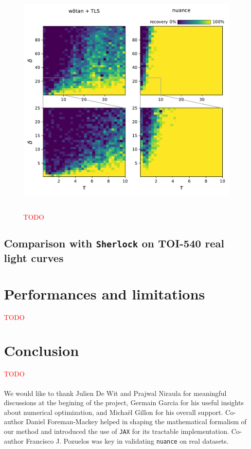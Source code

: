\documentclass{aastex631}
\newcommand{\TODO}{\textcolor{red}{TODO}}
\begin{document}
\begin{figure}[H]
    \begin{centering}
        \includegraphics[height=12cm]{../workflows/synthetic_injection_recovery/figures/final_result.pdf}
        \caption{\TODO}
        \label{fig:simu}
    \end{centering}
\end{figure}

\subsection{Comparison with \texttt{Sherlock} on TOI-540 real light curves}\label{real}

\section{Performances and limitations}\label{perf}
\TODO

\section{Conclusion}
\TODO
\\\\
We would like to thank Julien De Wit and Prajwal Niraula for meaningful discussions at the begining of the project, Germain Garcia for his useful insights about numerical optimization, and Michaël Gillon for his overall support. Co-author Daniel Foreman-Mackey helped in shaping the mathematical formalism of our method and introduced the use of \texttt{JAX} for its tractable implementation. Co-author Francisco J. Pozuelos was key in validating \texttt{nuance} on real datasets.
\end{document}
